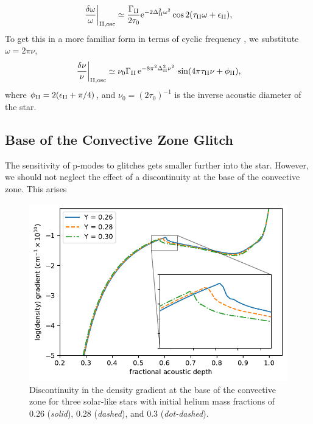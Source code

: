 %
\begin{equation}
    \left.\frac{\delta\omega}{\omega}\right|_{{\mathrm{II}}, \mathrm{osc}} \simeq \frac{\Gamma_{{\mathrm{II}}}}{2 \tau_0} \mathrm{e}^{- 2 \Delta_{{\mathrm{II}}}^2 \omega^2} \cos 2 (\tau_{{\mathrm{II}}}\omega + \epsilon_{{\mathrm{II}}}),
\end{equation}
%
To get this in a more familiar form in terms of cyclic frequency \citep[e.g.][]{Verma.Faria.ea2014,Verma.Raodeo.ea2017}, we substitute \(\omega = 2\pi\nu\),
%
\begin{equation}
    \left.\frac{\delta\nu}{\nu}\right|_{{\mathrm{II}}, \mathrm{osc}} \simeq \nu_0 \Gamma_{{\mathrm{II}}} \, \mathrm{e}^{- 8 \pi^2 \Delta_{{\mathrm{II}}}^2 \nu^2} \, \sin ( 4 \pi \tau_{{\mathrm{II}}} \nu + \phi_{{\mathrm{II}}}), \label{eq:he-osc}
\end{equation}
%
where \(\phi_{{\mathrm{II}}} = 2(\epsilon_{{\mathrm{II}}} + \pi/4)\), and \(\nu_0 = (2 \tau_0)^{-1}\) is the inverse acoustic diameter of the star.

\subsection{Base of the Convective Zone Glitch}\label{sec:bcz-glitch}

The sensitivity of p-modes to glitches gets smaller further into the star. However, we should not neglect the effect of a discontinuity at the base of the convective zone. This arises 

\begin{figure}[!tb]
    \centering
    \includegraphics{figures/bcz-density-gradient.pdf}
    \caption{Discontinuity in the density gradient at the base of the convective zone for three solar-like stars with initial helium mass fractions of 0.26 (\emph{solid}), 0.28 (\emph{dashed}), and 0.3 (\emph{dot-dashed}).}
    \label{fig:bcz-density}
\end{figure}


